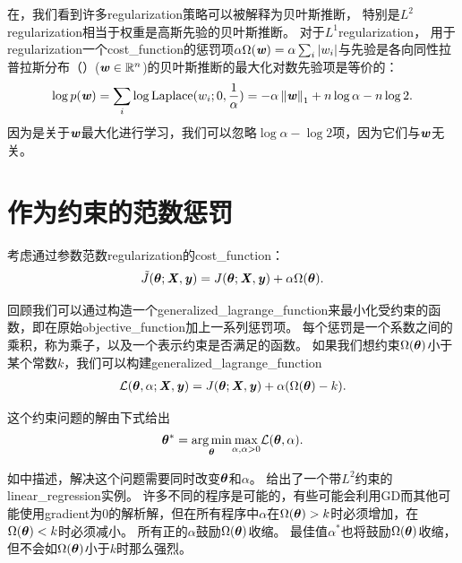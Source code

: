 在，我们看到许多\gls{regularization}策略可以被解释为贝叶斯推断，
 特别是$L^2$\gls{regularization}相当于权重是高斯先验的贝叶斯推断。
 对于$L^1$\gls{regularization}，
用于\gls{regularization}一个\gls{cost_function}的惩罚项$\alpha \Omega(\boldsymbol{\mathit{w}}) =  \alpha \sum_i |w_i |$与先验是各向同性拉普拉斯分布（）($\boldsymbol{\mathit{w}} \in \mathbb{R}^n$)的贝叶斯推断的最大化对数先验项是等价的：
\begin{align}
\log p(\boldsymbol{\mathit{w}}) = \sum_i \log \text{Laplace}(w_i;0,\frac{1}{\alpha}) = 
  -\alpha \left\lVert\boldsymbol{\mathit{w}}\right\rVert_1 + n \log \alpha - n \log 2.
\end{align}
因为是关于$\boldsymbol{\mathit{w}}$最大化进行学习，我们可以忽略$\log \alpha - \log 2$项，因为它们与$\boldsymbol{\mathit{w}}$无关。
 
 
 \section{作为约束的范数惩罚}
 \label{sec:7.2}
考虑通过参数范数\gls{regularization}的\gls{cost_function}：
\begin{align}
 \tilde{J}(\boldsymbol{\theta};\boldsymbol{\mathit{X}}, \boldsymbol{\mathit{y}}) = J(\boldsymbol{\theta};\boldsymbol{\mathit{X}}, \boldsymbol{\mathit{y}}) + \alpha \Omega(\boldsymbol{\theta}) .
\end{align}

回顾我们可以通过构造一个\gls{generalized_lagrange_function}来最小化受约束的函数，即在原始\gls{objective_function}加上一系列惩罚项。
每个惩罚是一个系数之间的乘积，称为乘子，以及一个表示约束是否满足的函数。
如果我们想约束$\Omega(\boldsymbol{\theta})$小于某个常数$k$，我们可以构建\gls{generalized_lagrange_function}
\begin{align}
 \mathcal{L}(\boldsymbol{\theta}, \alpha; \boldsymbol{\mathit{X}}, \boldsymbol{\mathit{y}}) = J(\boldsymbol{\theta}; \boldsymbol{\mathit{X}}, \boldsymbol{\mathit{y}}) + \alpha (\Omega(\boldsymbol{\theta}) - k).
\end{align}

这个约束问题的解由下式给出
\begin{align}
 \boldsymbol{\theta}^* = \underset{\boldsymbol{\theta}}{ \arg\min} \underset{\alpha, \alpha>0}{\max} \mathcal{L}(\boldsymbol{\theta}, \alpha).
\end{align}

如中描述，解决这个问题需要同时改变$\boldsymbol{\theta}$和$\alpha$。
给出了一个带$L^2$约束的\gls{linear_regression}实例。
许多不同的程序是可能的，有些可能会利用\gls{GD}而其他可能使用\gls{gradient}为0的解析解，但在所有程序中$\alpha$在$\Omega(\boldsymbol{\theta}) > k$时必须增加，在$\Omega(\boldsymbol{\theta}) < k$时必须减小。
所有正的$\alpha$鼓励$\Omega(\boldsymbol{\theta})$收缩。
最佳值$\alpha^*$也将鼓励$\Omega(\boldsymbol{\theta})$收缩，但不会如$\Omega(\boldsymbol{\theta})$小于$k$时那么强烈。

